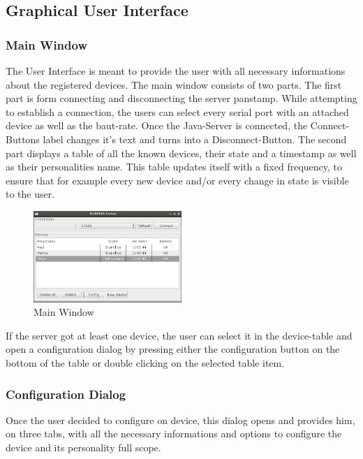 \subsection{Graphical User Interface}
\subsubsection{Main Window}
The User Interface is meant to provide the user with all necessary informations about the registered devices. The main window consists of two parts. 
The first part is form connecting and disconnecting the server panstamp. While attempting to establish a connection, the users can select every serial port with an attached device as well as the baut-rate. Once the Java-Server is connected, the Connect-Buttons label changes it's text and turns into a Disconnect-Button.
The second part displays a table of all the known devices, their state and a timestamp as well as their personalities name. This table updates itself with a fixed frequency, to ensure that for example every new device and/or every change in state is visible to the user.

\begin{figure}[h!]
 \centering
 \includegraphics[width= 0.5\textwidth, clip=true  ,keepaspectratio=true]{./pic/java-server-main.png}
 \caption{Main Window}
 \label{fig:java-server-main}
\end{figure}



If the server got at least one device, the user can select it in the device-table and open a configuration dialog by pressing either the configuration button on the bottom of the table or double clicking on the selected table item.

\subsubsection{Configuration Dialog}
Once the user decided to configure on device, this dialog opens and provides him, on three tabs, with all the necessary informations and options to configure the device and its personality full scope. %

